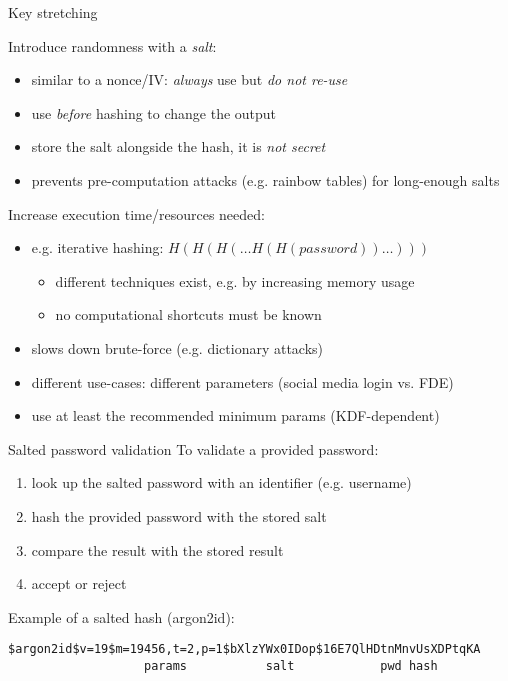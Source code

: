 \begin{frame}{Key stretching}

  \pause
  Introduce randomness with a \emph{salt}:
  \begin{itemize}[<+(1)->]
    \item similar to a nonce/IV: \emph{always} use but \emph{do not re-use}
    \item use \emph{before} hashing to change the output
    \item store the salt alongside the hash, it is \emph{not secret}
    \item prevents pre-computation attacks (e.g. rainbow tables) for long-enough salts
  \end{itemize}
  
  \pause
  Increase execution time/resources needed:
  \begin{itemize}[<+(1)->]
    \item e.g. iterative hashing: $H(H(H(\dots H(H(\mathit{password}))\dots)))$
    \begin{itemize}
      \item different techniques exist, e.g. by increasing memory usage
      \item no computational shortcuts must be known
    \end{itemize}
    \item slows down brute-force (e.g. dictionary attacks)
    \item different use-cases: different parameters (social media login vs. FDE)
    \item use at least the recommended minimum params (KDF-dependent)
  \end{itemize}

\end{frame}

\begin{frame}[fragile]{Salted password validation}
  To validate a provided password:
  \begin{enumerate}[<+(1)->]
    \item look up the salted password with an identifier (e.g. username)
    \item hash the provided password with the stored salt
    \item compare the result with the stored result
    \item accept or reject
  \end{enumerate}

  \vspace*{1em}

  \pause
  Example of a salted hash (argon2id):
  \vspace*{-1em}
  \begin{center}
    \texttt{\$argon2id\$v=19\${\color{Melon}m=19456,t=2,p=1}\${\color{CadetBlue}bXlzYWx0IDop}\${\color{PineGreen}16E7QlHDtnMnvUsXDPtqKA}}\\
    \texttt{%
    \ \ \ \ \ \ \ \ \ \ \ \ \ \ \ \ %
    \ {\color{Melon}params}\ \ \ \ \ %
    \ \ \ \ \ {\color{CadetBlue}salt}\ \ \ \ \ %
    \ \ \ \ \ \ {\color{PineGreen}pwd hash}%
    \ \ \ \ \ \ \ }
  \end{center}
\end{frame}

